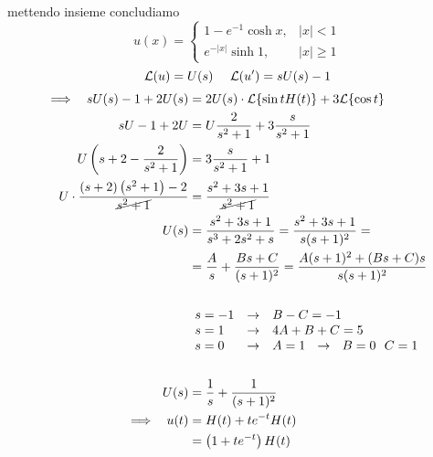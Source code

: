 mettendo insieme concludiamo
\begin{equation*}
u(x) = 
\begin{cases}
1 - e^{- 1}\cosh x, & | x| < 1\\
e^{- | x|}\sinh 1, & | x| \geq 1
\end{cases}
\end{equation*}
\Soluzione
\begin{equation*}
\mathcal{L}(u) = U(s) \ \ \ \ \mathcal{L}(u') = sU(s) - 1
\end{equation*}
\begin{align*}
\implies \ \ sU(s) - 1 + 2U(s) & = 2U(s) \cdot \mathcal{L}\{\sin tH(t)\} + 3\mathcal{L}\{\cos t\}\\
sU - 1 + 2U & = U\frac{2}{s^{2} + 1} + 3\frac{s}{s^{2} + 1}\\
U\left(s + 2 - \frac{2}{s^{2} + 1}\right) & = 3\frac{s}{s^{2} + 1} + 1\\
U \cdot \frac{(s + 2)\left(s^{2} + 1\right) - 2}{\cancel{s^{2} + 1}} & = \frac{s^{2} + 3s + 1}{\cancel{s^{2} + 1}}\\
U(s) & = \frac{s^{2} + 3s + 1}{s^{3} + 2s^{2} + s} = \frac{s^{2} + 3s + 1}{s(s + 1)^{2}} = \\
 & = \frac{A}{s} + \frac{Bs + C}{(s + 1)^{2}} = \frac{A(s + 1)^{2} + (Bs + C) s}{s(s + 1)^{2}}\\
 & \\
 & 
 \begin{array}{l c l}
s = -1 & \rightarrow  & B - C = -1\\
s = 1 & \rightarrow  & 4A + B + C = 5\\
s = 0 & \rightarrow  & A = 1\ \ \rightarrow \ \ B = 0\ \ C = 1
\end{array}\\
 & \ \ \ \ \\
U(s) & = \frac{1}{s} + \frac{1}{(s + 1)^{2}}\\
\implies \ \ u(t) & = H(t) + te^{- t} H(t)\\
 & = \left(1 + te^{- t}\right) H(t)
\end{align*}
\Soluzione


